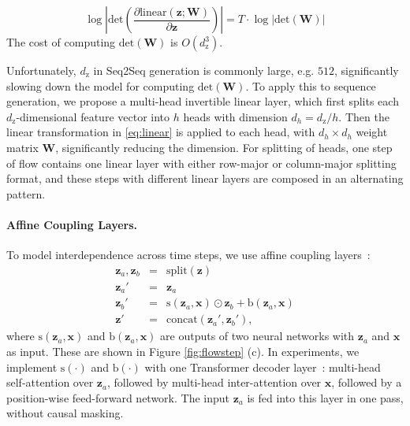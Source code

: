 \documentclass[11pt,a4paper]{article}
\newcommand{\xv}{\mathbf{x}}
\newcommand{\zv}{\mathbf{z}}
\begin{document}
\vspace{-2mm}
{\small
\begin{displaymath}
\log \left| \mathrm{det} \left( \frac{\partial \mathrm{linear}(\zv; \mathbf{W})}{\partial \zv}\right) \right| = T \cdot \log |\mathrm{det} (\mathbf{W})|
\end{displaymath}
}
The cost of computing $\mathrm{det}(\mathbf{W})$ is $O(d_{\mathrm{z}}^3)$.

Unfortunately, $d_{\mathrm{z}}$ in Seq2Seq generation is commonly large, e.g. $512$, significantly slowing down the model for computing $\mathrm{det}(\mathbf{W})$. 
To apply this to sequence generation, we propose a multi-head invertible linear layer, which first splits each $d_{\mathrm{z}}$-dimensional feature vector into $h$ heads with dimension $d_h = d_{\mathrm{z}}/h$.
Then the linear transformation in \eqref{eq:linear} is applied to each head, with $d_h\times d_h$ weight matrix $\mathbf{W}$, significantly reducing the dimension.
For splitting of heads, one step of flow contains one linear layer with either row-major or column-major splitting format, and these steps with different linear layers are composed in an alternating pattern.


\paragraph{Affine Coupling Layers.} 
To model interdependence across time steps, we use affine coupling layers~\citep{dinh2016density}:
\begin{displaymath}
\begin{array}{rcl}
\zv_a, \zv_b & = & \mathrm{split}(\zv) \\
\zv_a' & = & \zv_a \\
\zv_b' & = & \mathrm{s}(\zv_a, \xv) \odot \zv_b + \mathrm{b}(\zv_a, \xv) \\
\zv' & = & \mathrm{concat}(\zv_a', \zv_b'),
\end{array}
\end{displaymath}
where $\mathrm{s}(\zv_a, \xv)$ and $\mathrm{b}(\zv_a, \xv)$ are outputs of two neural networks with $\zv_a$ and $\xv$ as input.
These are shown in Figure \ref{fig:flowstep} (c).
In experiments, we implement $\mathrm{s}(\cdot)$ and $\mathrm{b}(\cdot)$ with one Transformer decoder layer~\citep{vaswani2017attention}: multi-head self-attention over $\zv_a$, followed by multi-head inter-attention over $\xv$, followed by a position-wise feed-forward network.
The input $\zv_a$ is fed into this layer in one pass, without causal masking.
\end{document}
